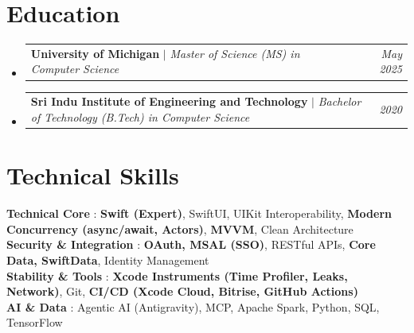 \documentclass[letterpaper,10pt]{article}
\makeatletter
\newcommand{\sectionspace}{
\vspace{-20pt}
}
\newcommand{\subheadingtitlevspace}{
\vspace{-3pt}
}
\newcommand{\titleItem}[1]{
  \textbf{#1}
}
\newcommand{\resumeProjectHeading}[2]{
    \item
    \begin{tabular*}{0.97\textwidth}{l@{\extracolsep{\fill}}r}
      #1 & \textit{ #2} \\
    \end{tabular*}\vspace{-9pt}
}
\newcommand{\resumeSubHeadingListStart}{\subheadingtitlevspace\begin{itemize}[leftmargin=0.15in, label={}]}
\newcommand{\resumeSubHeadingListEnd}{\end{itemize}}
\makeatother
\begin{document}
\section{Education}
  \resumeSubHeadingListStart
    \resumeProjectHeading
      {\titleItem{University of Michigan} $|$ \emph{Master of Science (MS) in Computer Science}}{May 2025} 
    \resumeProjectHeading
      {\titleItem{Sri Indu Institute of Engineering and Technology} $|$ \emph{Bachelor of Technology (B.Tech) in Computer Science}}{2020}
  \resumeSubHeadingListEnd

\section{Technical Skills}
 \begin{itemize}[leftmargin=0.15in, label={}]
    {\item{
      \titleItem{Technical Core}{: \textbf{Swift (Expert)}, SwiftUI, UIKit Interoperability, \textbf{Modern Concurrency (async/await, Actors)}, \textbf{MVVM}, Clean Architecture} \\
      \titleItem{Security \& Integration}{: \textbf{OAuth, MSAL (SSO)}, RESTful APIs, \textbf{Core Data, SwiftData}, Identity Management} \\
      \titleItem{Stability \& Tools}{: \textbf{Xcode Instruments (Time Profiler, Leaks, Network)}, Git, \textbf{CI/CD (Xcode Cloud, Bitrise, GitHub Actions)}} \\
      \titleItem{AI \& Data}{: Agentic AI (Antigravity), MCP, Apache Spark, Python, SQL, TensorFlow}
    }}
 \end{itemize}
\sectionspace
\end{document}
